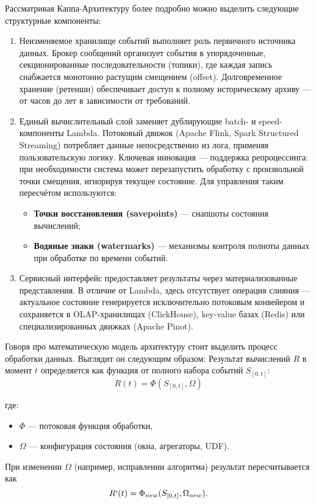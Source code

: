             
            Рассматривая Каппа-Архитектуру более подробно можно выделить следующие \\структурные компоненты:
            \begin{enumerate}
                \item Неизменяемое хранилище событий выполняет роль первичного источника данных. Брокер сообщений организует события в упорядоченные, секционированные последовательности (топики), где каждая запись снабжается монотонно растущим смещением (offset). Долговременное хранение (ретеншн) обеспечивает доступ к полному историческому архиву — от часов до лет в зависимости от требований.
                \item Единый вычислительный слой заменяет дублирующие batch- и speed-компоненты Lambda. Потоковый движок (Apache Flink, Spark Structured Streaming) потребляет данные непосредственно из лога, применяя пользовательскую логику. Ключевая инновация — поддержка репроцессинга: при необходимости система может перезапустить обработку с произвольной точки смещения, игнорируя текущее состояние. Для управления таким пересчётом используются:
                \begin{itemize}
                    \item \textbf{Точки восстановления (savepoints)} — снапшоты состояния вычислений;
                    \item \textbf{Водяные знаки (watermarks)} — механизмы контроля полноты данных при обработке по времени событий.
                \end{itemize}
                \item Сервисный интерфейс предоставляет результаты через материализованные представления. В отличие от Lambda, здесь отсутствует операция слияния — актуальное состояние генерируется исключительно потоковым конвейером и сохраняется в OLAP-хранилищах (ClickHouse), key-value базах (Redis) или специализированных движках (Apache Pinot).
            \end{enumerate}

            
            Говоря про математическую модель архитектуру стоит выделить процесс обработки данных. Выглядит он следующим образом:
            Результат вычислений $R$ в момент $t$ определяется как функция от полного набора событий $S_{[0,t]}$:
            \begin{equation}
                R(t) = \Phi(S_{[0,t]}, \Omega)
            \end{equation}

            где:
            \begin{itemize}
                \item $\Phi$ — потоковая функция обработки,
                \item $\Omega$ — конфигурация состояния (окна, агрегаторы, UDF).
            \end{itemize}
            При изменении $\Omega$ (например, исправлении алгоритма) результат пересчитывается как 
            \begin{equation}
                R`(t)=\Phi_{new}(S_{[0,t]},\Omega_{new}).  
            \end{equation}

